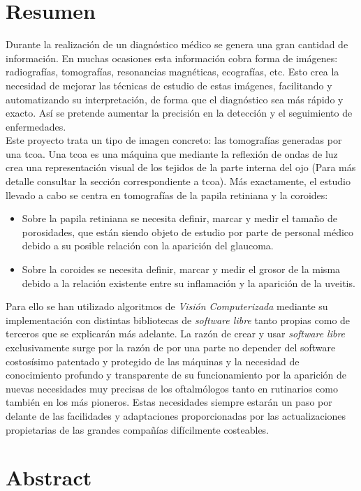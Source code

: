 \section*{Resumen}
Durante la realización de un diagnóstico médico se genera una gran
cantidad de información. En muchas ocasiones esta información cobra
forma de imágenes: radiografías, tomografías, resonancias magnéticas,
ecografías, etc. Esto crea la necesidad de mejorar las técnicas de
estudio de estas imágenes, facilitando y automatizando su
interpretación, de forma que el diagnóstico sea más rápido y
exacto. Así se pretende
aumentar la precisión en la detección y el seguimiento de enfermedades.\\
Este proyecto trata un tipo de imagen concreto: las tomografías
generadas por una \gls{tcoa}. Una \gls{tcoa} es una máquina que
mediante la reflexión de ondas de luz crea una representación visual
de los tejidos de la parte interna del ojo (Para más detalle consultar
la sección correspondiente a \gls{tcoa}). Más exactamente, el estudio
llevado a cabo se centra en tomografías de la papila retiniana y la
coroides:
\begin{itemize}
\item Sobre la papila retiniana se necesita definir, marcar y medir el
  tamaño de porosidades, que están siendo objeto de estudio por parte
  de personal médico debido a su posible relación con la aparición del
  glaucoma.
\item Sobre la coroides se necesita definir, marcar y medir el grosor
  de la misma debido a la relación existente entre su inflamación y la
  aparición de la uveitis.
\end{itemize}
Para ello se han utilizado algoritmos de \emph{Visión Computerizada}
mediante su implementación con distintas bibliotecas de \emph{software
  libre} tanto propias como de terceros que se explicarán más
adelante. La razón de crear y usar \emph{software libre}
exclusivamente surge por la razón de por una parte no depender del
software costosísimo patentado y protegido de las máquinas y la
necesidad de conocimiento profundo y transparente de su funcionamiento
por la aparición de nuevas necesidades muy precisas de los
oftalmólogos tanto en rutinarios como también en los más
pioneros. Estas necesidades siempre estarán un paso por delante de las
facilidades y adaptaciones proporcionadas por las actualizaciones
propietarias de las grandes compañías difícilmente costeables.
\newpage
\section*{Abstract}

